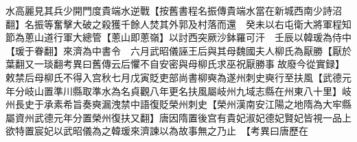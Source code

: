 水高麗見其兵少開門度貴端水逆戰【按舊書程名振傳貴端水當在新城西南少詩沼翻】名振等奮擊大破之殺獲千餘人焚其外郭及村落而還　癸未以右屯衛大將軍程知節為蔥山道行軍大總管【蔥山即蔥嶺】以討西突厥沙鉢羅可汗　壬辰以韓瑗為侍中【瑗于眷翻】來濟為中書令　六月武昭儀誣王后與其母魏國夫人柳氏為厭勝【厭於葉翻又一琰翻考異曰舊傳云后懼不自安密與母柳氏求巫祝厭勝事故廢今從實録】敕禁后母柳氏不得入宫秋七月戊寅貶吏部尚書柳奭為遂州刺史奭行至扶風【武德元年分岐山置準川縣取準水為名貞觀八年更名扶風屬岐州九域志縣在州東八十里】岐州長史于承素希旨奏奭漏洩禁中語復貶榮州刺史【榮州漢南安江陽之地隋為大牢縣屬資州武德元年分置榮州復扶又翻】唐因隋置後宫有貴妃淑妃德妃賢妃皆視一品上欲特置宸妃以武昭儀為之韓瑗來濟諫以為故事無之乃止　【考異曰唐歷在